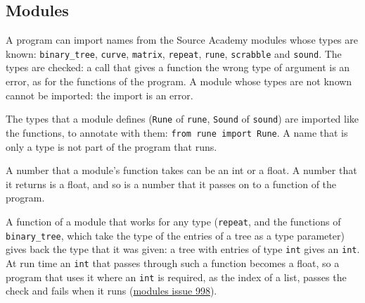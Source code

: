 \subsection*{Modules}

A program can import names from the Source Academy modules whose types are known:
\texttt{binary\_tree}, \texttt{curve}, \texttt{matrix}, \texttt{repeat}, \texttt{rune},
\texttt{scrabble} and \texttt{sound}. The types are checked: a call that gives a function the wrong
type of argument is an error, as for the functions of the program. A module whose types are not
known cannot be imported: the import is an error.

The types that a module defines (\texttt{Rune} of \texttt{rune}, \texttt{Sound} of
\texttt{sound}) are imported like the functions, to annotate with them:
\lstinline{from rune import Rune}. A name that is only a type is not part of the program that runs.

A number that a module's function takes can be an int or a float. A number that it returns is a
float, and so is a number that it passes on to a function of the program.

A function of a module that works for any type (\texttt{repeat}, and the functions of
\texttt{binary\_tree}, which take the type of the entries of a tree as a type parameter) gives
back the type that it was given: a tree with entries of type \texttt{int} gives an
\texttt{int}. At run time an \texttt{int} that passes through such a function becomes a float,
so a program that uses it where an \texttt{int} is required, as the index of a list, passes the
check and fails when it runs
(\href{https://github.com/source-academy/modules/issues/998}{\color{DarkBlue}modules issue 998}).
